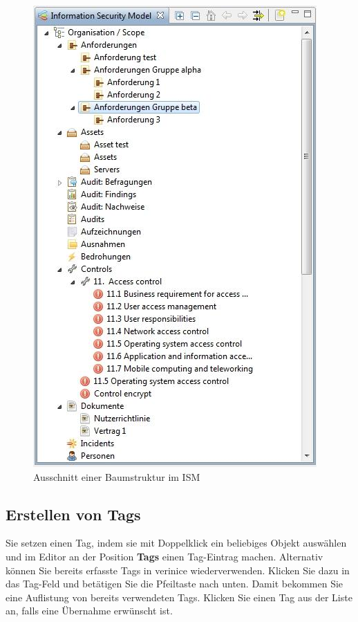 \documentclass[a4paper,10pt]{book}
\begin{document}
\begin{figure}[htb!]
  \centering
  \includegraphics[scale=.7]{Screenshot/Baumstruktur_ISM.jpg}
  \caption{\label{Ausschnitt einer Baumstruktur im ISM} Ausschnitt einer Baumstruktur im ISM}
\end{figure}

\subsection{Erstellen von Tags}
Sie setzen einen Tag, indem sie mit Doppelklick ein beliebiges Objekt
auswählen und
im Editor an der Position \textbf{Tags} einen Tag-Eintrag machen.
Alternativ können Sie bereits erfasste Tags in verinice wiederverwenden.
Klicken Sie dazu in das Tag-Feld und betätigen Sie die Pfeiltaste nach unten.
Damit bekommen Sie eine Auflistung von bereits verwendeten Tags. Klicken
Sie einen Tag aus der Liste an, falls eine Übernahme erwünscht ist.
\end{document}
